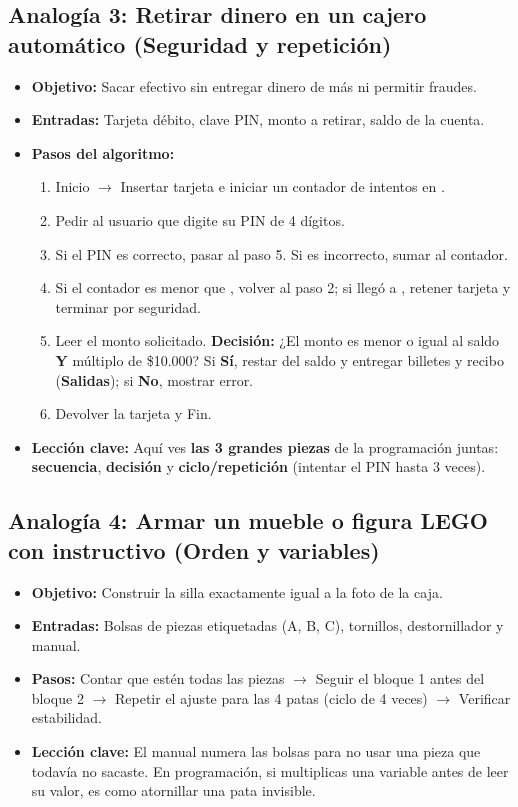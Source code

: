\documentclass[11pt,letterpaper]{article}
\begin{document}
\subsection{Analogía 3: Retirar dinero en un cajero automático (Seguridad y repetición)}
\begin{itemize}
  \item \textbf{Objetivo:} Sacar efectivo sin entregar dinero de más ni permitir fraudes.
  \item \textbf{Entradas:} Tarjeta débito, clave PIN, monto a retirar, saldo de la cuenta.
  \item \textbf{Pasos del algoritmo:}
    \begin{enumerate}
      \item Inicio $\rightarrow$ Insertar tarjeta e iniciar un contador de intentos en .
      \item Pedir al usuario que digite su PIN de 4 dígitos.
      \item Si el PIN es correcto, pasar al paso 5. Si es incorrecto, sumar  al contador.
      \item Si el contador es menor que , volver al paso 2; si llegó a , retener tarjeta y terminar por seguridad.
      \item Leer el monto solicitado. \textbf{Decisión:} ¿El monto es menor o igual al saldo \textbf{Y} múltiplo de \$10.000? Si \textbf{Sí}, restar del saldo y entregar billetes y recibo (\textbf{Salidas}); si \textbf{No}, mostrar error.
      \item Devolver la tarjeta y Fin.
    \end{enumerate}
  \item \textbf{Lección clave:} Aquí ves \textbf{las 3 grandes piezas} de la programación juntas: \textbf{secuencia}, \textbf{decisión} y \textbf{ciclo/repetición} (intentar el PIN hasta 3 veces).
\end{itemize}

\subsection{Analogía 4: Armar un mueble o figura LEGO con instructivo (Orden y variables)}
\begin{itemize}
  \item \textbf{Objetivo:} Construir la silla exactamente igual a la foto de la caja.
  \item \textbf{Entradas:} Bolsas de piezas etiquetadas (A, B, C), tornillos, destornillador y manual.
  \item \textbf{Pasos:} Contar que estén todas las piezas $\rightarrow$ Seguir el bloque 1 antes del bloque 2 $\rightarrow$ Repetir el ajuste para las 4 patas (ciclo de 4 veces) $\rightarrow$ Verificar estabilidad.
  \item \textbf{Lección clave:} El manual numera las bolsas para no usar una pieza que todavía no sacaste. En programación, si multiplicas una variable antes de leer su valor, es como atornillar una pata invisible.
\end{itemize}
\end{document}
